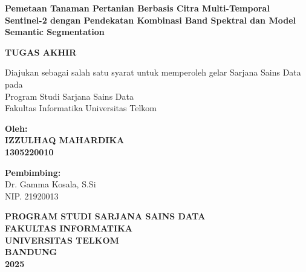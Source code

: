\documentclass[12pt,a4paper]{report}
\begin{document}
\begin{titlepage}
    \centering
    \vspace*{1cm}
    
    {\Large \textbf{Pemetaan Tanaman Pertanian Berbasis Citra Multi-Temporal Sentinel-2 dengan Pendekatan Kombinasi Band Spektral dan Model Semantic Segmentation}}
    
    \vspace{1.5cm}
    
    \textbf{TUGAS AKHIR}
    
    \vspace{1.5cm}
    
    Diajukan sebagai salah satu syarat untuk memperoleh gelar Sarjana Sains Data pada\\
    Program Studi Sarjana Sains Data\\
    Fakultas Informatika Universitas Telkom
    
    \vspace{1.5cm}
    
    \textbf{Oleh:}\\
    \textbf{IZZULHAQ MAHARDIKA}\\
    \textbf{1305220010}
    
    \vspace{1.5cm}
    
    \textbf{Pembimbing:}\\
    Dr. Gamma Kosala, S.Si\\
    NIP. 21920013
    
    \vspace{2cm}
    
    \textbf{PROGRAM STUDI SARJANA SAINS DATA}\\
    \textbf{FAKULTAS INFORMATIKA}\\
    \textbf{UNIVERSITAS TELKOM}\\
    \textbf{BANDUNG}\\
    \textbf{2025}
    
\end{titlepage}
\end{document}
